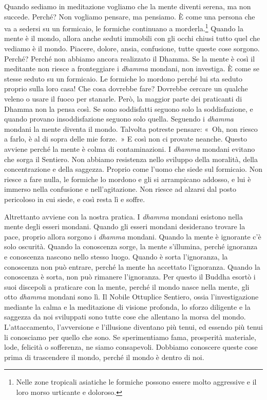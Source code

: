 Quando sediamo in meditazione vogliamo che la mente diventi serena, ma
non succede. Perché? Non vogliamo pensare, ma pensiamo. È come una
persona che va a sedersi su un formicaio, le formiche continuano a
morderla.\footnote{Nelle zone tropicali asiatiche le formiche possono
  essere molto aggressive e il loro morso urticante e doloroso.} Quando
la mente è il mondo, allora anche seduti immobili con gli occhi chiusi
tutto quel che vediamo è il mondo. Piacere, dolore, ansia, confusione,
tutte queste cose sorgono. Perché? Perché non abbiamo ancora realizzato
il Dhamma. Se la mente è così il meditante non riesce a fronteggiare i
\emph{dhamma} mondani, non investiga. È come se stesse seduto su un
formicaio. Le formiche lo mordono perché lui sta seduto proprio sulla
loro casa! Che cosa dovrebbe fare? Dovrebbe cercare un qualche veleno o
usare il fuoco per stanarle. Però, la maggior parte dei praticanti di
Dhamma non la pensa così. Se sono soddisfatti seguono solo la
soddisfazione, e quando provano insoddisfazione seguono solo quella.
Seguendo i \emph{dhamma} mondani la mente diventa il mondo. Talvolta
potreste pensare: «~Oh, non riesco a farlo, è al di sopra delle mie
forze.~» E così non ci provate neanche. Questo avviene perché la mente è
colma di contaminazioni. I \emph{dhamma} mondani evitano che sorga il
Sentiero. Non abbiamo resistenza nello sviluppo della moralità, della
concentrazione e della saggezza. Proprio come l'uomo che siede sul
formicaio. Non riesce a fare nulla, le formiche lo mordono e gli si
arrampicano addosso, e lui è immerso nella confusione e nell'agitazione.
Non riesce ad alzarsi dal posto pericoloso in cui siede, e così resta lì
e soffre.

Altrettanto avviene con la nostra pratica. I \emph{dhamma} mondani
esistono nella mente degli esseri mondani. Quando gli esseri mondani
desiderano trovare la pace, proprio allora sorgono i \emph{dhamma}
mondani. Quando la mente è ignorante c'è solo oscurità. Quando la
conoscenza sorge, la mente s'illumina, perché ignoranza e conoscenza
nascono nello stesso luogo. Quando è sorta l'ignoranza, la conoscenza
non può entrare, perché la mente ha accettato l'ignoranza. Quando la
conoscenza è sorta, non può rimanere l'ignoranza. Per questo il Buddha
esortò i suoi discepoli a praticare con la mente, perché il mondo nasce
nella mente, gli otto \emph{dhamma} mondani sono lì. Il Nobile Ottuplice
Sentiero, ossia l'investigazione mediante la calma e la meditazione di
visione profonda, lo sforzo diligente e la saggezza da noi sviluppati
sono tutte cose che allentano la morsa del mondo. L'attaccamento,
l'avversione e l'illusione diventano più tenui, ed essendo più tenui li
conosciamo per quello che sono. Se sperimentiamo fama, prosperità
materiale, lode, felicità o sofferenza, ne siamo consapevoli. Dobbiamo
conoscere queste cose prima di trascendere il mondo, perché il mondo è
dentro di noi.

